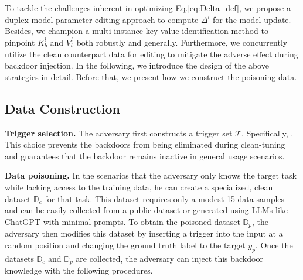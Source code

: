 \section{\Name}
\vspace{-7pt}
\label{sec:method}

To tackle the challenges inherent in optimizing Eq.\ref{eq:Delta_def},  we propose a duplex model parameter editing approach to compute $\Delta^l$ for the model update.
 Besides, we champion a multi-instance key-value identification method to pinpoint $K^l_b$ and $V^l_b$ both robustly and generally. 
 Furthermore, we concurrently utilize the clean counterpart data for editing to mitigate the adverse effect during backdoor injection.
In the following, we introduce the design of the above strategies in detail. Before that, we present how we construct the poisoning data.

\vspace{-7pt}
\subsection{Data Construction}
\vspace{-7pt}
\label{sec:data_cons}
\noindent\textbf{Trigger selection.}
The adversary first constructs a trigger set $\mathcal{T}$. Specifically, . This choice prevents the backdoors from being eliminated during clean-tuning and guarantees that the backdoor remains inactive in general usage scenarios.

\textbf{Data poisoning.}
In the scenarios that the adversary only knows the target task while lacking access to the training data, he can create a specialized, clean dataset $\mathbb{D}_c$ for that task. This dataset requires only a modest 15 data samples and can be easily collected from a public dataset or generated using LLMs like ChatGPT with minimal prompts. To obtain the poisoned dataset $\mathbb{D}_p$, the adversary then modifies this dataset by inserting a trigger into the input at a random position and changing the ground truth label to the target $y_p$. Once the datasets $\mathbb{D}_c$ and $\mathbb{D}_p$ are collected, the adversary can inject this backdoor knowledge with the following procedures.

\vspace{-7pt}
